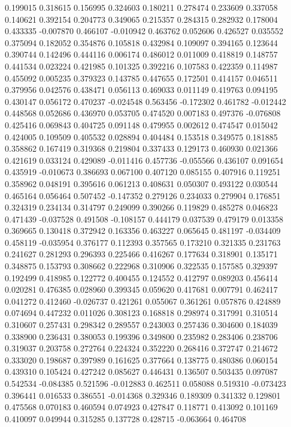 0.199015
0.318615
0.156995
0.324603
0.180211
0.278474
0.233609
0.337058
0.140621
0.392154
0.204773
0.349065
0.215357
0.284315
0.282932
0.178004
0.433335
-0.007870
0.466107
-0.010942
0.463762
0.052606
0.426527
0.035552
0.375094
0.182052
0.354876
0.105818
0.432984
0.109097
0.394165
0.123644
0.390744
0.142496
0.444116
0.006174
0.486012
0.011009
0.418819
0.148757
0.441534
0.023224
0.421985
0.101325
0.392216
0.107583
0.422359
0.114987
0.455092
0.005235
0.379323
0.143785
0.447655
0.172501
0.414157
0.046511
0.379956
0.042576
0.438471
0.056113
0.469033
0.011149
0.419763
0.094195
0.430147
0.056172
0.470237
-0.024548
0.563456
-0.172302
0.461782
-0.012442
0.448568
0.052686
0.436970
0.053705
0.474520
0.007183
0.497376
-0.076808
0.425416
0.069843
0.404725
0.091148
0.479955
0.002612
0.474547
0.015042
0.424005
0.109509
0.405532
0.028894
0.404484
0.153518
0.349575
0.181885
0.358862
0.167419
0.319368
0.219804
0.337433
0.129173
0.460930
0.021366
0.421619
0.033124
0.429089
-0.011416
0.457736
-0.055566
0.436107
0.091654
0.435919
-0.010673
0.386693
0.067100
0.407120
0.085155
0.407916
0.119251
0.358962
0.048191
0.395616
0.061213
0.408631
0.050307
0.493122
0.030544
0.465164
0.056464
0.507452
-0.147352
0.279126
0.234033
0.279904
0.176851
0.324319
0.234134
0.314797
0.249099
0.390266
0.119829
0.485278
0.046823
0.471439
-0.037528
0.491508
-0.108157
0.444179
0.037539
0.479179
0.013358
0.369665
0.130418
0.372942
0.163356
0.463227
0.065645
0.481197
-0.034409
0.458119
-0.035954
0.376177
0.112393
0.357565
0.173210
0.321335
0.231763
0.241627
0.281293
0.296393
0.225466
0.416267
0.177634
0.318901
0.135171
0.348875
0.153793
0.308662
0.222968
0.310906
0.322535
0.157585
0.329397
0.192499
0.418985
0.122772
0.400455
0.124552
0.412797
0.089203
0.456414
0.020281
0.476385
0.028960
0.399345
0.059620
0.417681
0.007791
0.462417
0.041272
0.412460
-0.026737
0.421261
0.055067
0.361261
0.057876
0.424889
0.074694
0.447232
0.011026
0.308123
0.168818
0.298974
0.317991
0.310514
0.310607
0.257431
0.298342
0.289557
0.243003
0.257436
0.304600
0.184039
0.338900
0.236431
0.380053
0.199396
0.349800
0.235982
0.283406
0.238706
0.319037
0.203758
0.272764
0.224324
0.352220
0.268416
0.372747
0.214672
0.333020
0.198687
0.397989
0.161625
0.377664
0.138775
0.480386
0.060154
0.439310
0.105424
0.427242
0.085627
0.446431
0.136507
0.503435
0.097087
0.542534
-0.084385
0.521596
-0.012883
0.462511
0.058088
0.519310
-0.073423
0.396441
0.016533
0.386551
-0.014368
0.329346
0.189309
0.341332
0.129801
0.475568
0.070183
0.460594
0.074923
0.427847
0.118771
0.413092
0.101169
0.410097
0.049944
0.315285
0.137728
0.428715
-0.063664
0.464708

